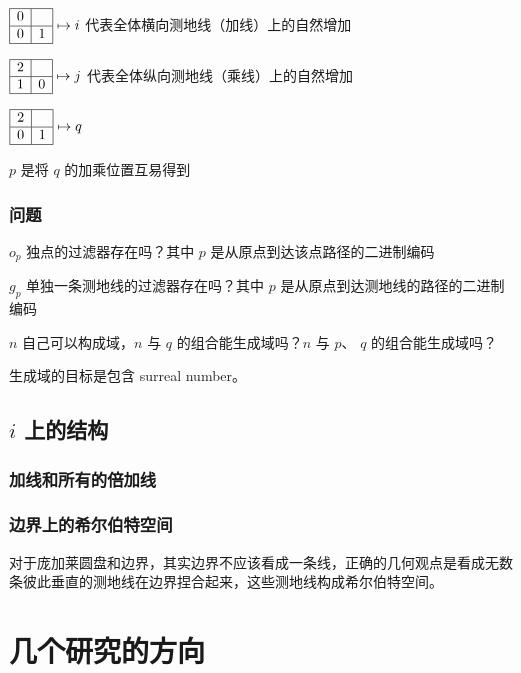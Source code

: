 \documentclass[a4paper,12pt]{article}
\begin{document}
$\begin{array}{|c|c|}\hline0&\space\\\hline 0&1\\\hline\end{array} \mapsto i$ 代表全体横向测地线（加线）上的自然增加

$\begin{array}{|c|c|}\hline2&\space\\\hline 1&0\\\hline\end{array} \mapsto j$ 代表全体纵向测地线（乘线）上的自然增加

$\begin{array}{|c|c|}\hline2&\space\\\hline 0&1\\\hline\end{array} \mapsto q$

$p$ 是将 $q$ 的加乘位置互易得到

\subsubsection{问题}

$o_p$ 独点的过滤器存在吗？其中 $p$ 是从原点到达该点路径的二进制编码

$g_p$ 单独一条测地线的过滤器存在吗？其中 $p$ 是从原点到达测地线的路径的二进制编码

$n$ 自己可以构成域，$n$ 与 $q$ 的组合能生成域吗？$n$ 与 $p$、 $q$ 的组合能生成域吗？

生成域的目标是包含 surreal number。

\subsection{$i$ 上的结构}

\subsubsection{加线和所有的倍加线}

\subsubsection{边界上的希尔伯特空间}

对于庞加莱圆盘和边界，其实边界不应该看成一条线，正确的几何观点是看成无数条彼此垂直的测地线在边界捏合起来，这些测地线构成希尔伯特空间。

\newpage

\section{几个研究的方向}
\end{document}
